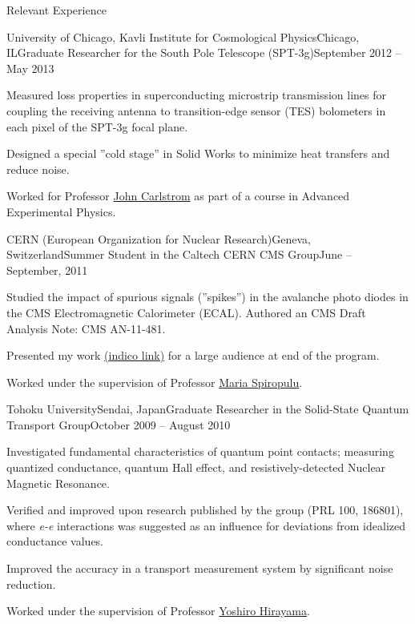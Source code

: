 \documentclass{resume}
\begin{document}
\begin{rsection}{Relevant Experience}

  \begin{rsubsection}{University of Chicago, Kavli Institute for Cosmological Physics}{Chicago, IL}{Graduate Researcher for the South Pole Telescope (SPT-3g)}{September 2012 -- May 2013}
  \item Measured loss properties in superconducting microstrip transmission lines for coupling the receiving antenna to transition-edge sensor (TES) bolometers in each pixel of the SPT-3g focal plane.
  \item Designed a special ''cold stage'' in Solid Works to minimize heat transfers and reduce noise. 
  \item Worked for Professor \href{https://kicp.uchicago.edu/people/profile/john_carlstrom.html}{John Carlstrom} as part of a course in Advanced Experimental Physics.
  \end{rsubsection}


  \begin{rsubsection}{CERN (European Organization for Nuclear Research)}{Geneva, Switzerland}{Summer Student in the Caltech CERN CMS Group}{June -- September, 2011}
  \item Studied the impact of spurious signals (''spikes'') in the avalanche photo diodes in the CMS Electromagnetic Calorimeter (ECAL). Authored an CMS Draft Analysis Note: CMS AN-11-481.
  \item Presented my work \href{http://indico.cern.ch/conferenceDisplay.py?confId=135576}{(indico link)} for a large audience at end of the program.
  \item Worked under the supervision of Professor \href{http://www.hep.caltech.edu/~smaria/}{Maria Spiropulu}.
  \end{rsubsection}


  \begin{rsubsection}{Tohoku University}{Sendai, Japan}{Graduate Researcher in the Solid-State Quantum Transport Group}{October 2009 -- August 2010}
  \item Investigated fundamental characteristics of quantum point contacts; measuring quantized conductance, quantum Hall effect, and resistively-detected Nuclear Magnetic Resonance.
  \item Verified and improved upon research published by the group (PRL 100, 186801), where \textit{e-e} interactions was suggested as an influence for deviations from idealized conductance values.
  \item Improved the accuracy in a transport measurement system by significant noise reduction.
  \item Worked under the supervision of Professor \href{http://quant-trans.org/lab/profile-e.html}{Yoshiro Hirayama}.
  \end{rsubsection}


\end{rsection}
\end{document}
